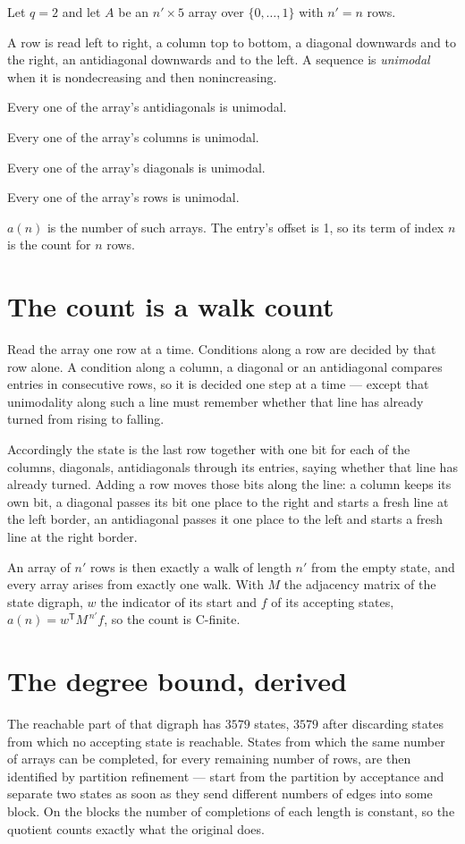 \documentclass[11pt]{article}
\theoremstyle{definition}
\begin{document}
Let $q = 2$ and let $A$ be an $n' \times 5$ array over $\{0,\dots,1\}$ with $n' = n$ rows.

A row is read left to right, a column top to bottom, a diagonal downwards and to the right, an antidiagonal downwards and to the left. A sequence is {\itshape unimodal} when it is nondecreasing and then nonincreasing.

Every one of the array's antidiagonals is unimodal.

Every one of the array's columns is unimodal.

Every one of the array's diagonals is unimodal.

Every one of the array's rows is unimodal.

$a(n)$ is the number of such arrays. The entry's offset is 1, so its term of index $n$ is the count for $n$ rows.

\section{The count is a walk count}

Read the array one row at a time. Conditions along a row are decided by that row alone. A condition along a column, a diagonal or an antidiagonal compares entries in consecutive rows, so it is decided one step at a time --- except that unimodality along such a line must remember whether that line has already turned from rising to falling.

Accordingly the state is the last row together with one bit for each of the columns, diagonals, antidiagonals through its entries, saying whether that line has already turned. Adding a row moves those bits along the line: a column keeps its own bit, a diagonal passes its bit one place to the right and starts a fresh line at the left border, an antidiagonal passes it one place to the left and starts a fresh line at the right border.

An array of $n'$ rows is then exactly a walk of length $n'$ from the empty state, and every array arises from exactly one walk. With $M$ the adjacency matrix of the state digraph, $w$ the indicator of its start and $f$ of its accepting states, $a(n) = w^{\mathsf T}M^{\,n'}f$, so the count is C-finite.

\section{The degree bound, derived}

The reachable part of that digraph has $3579$ states, $3579$ after discarding states from which no accepting state is reachable. States from which the same number of arrays can be completed, for every remaining number of rows, are then identified by partition refinement --- start from the partition by acceptance and separate two states as soon as they send different numbers of edges into some block. On the blocks the number of completions of each length is constant, so the quotient counts exactly what the original does.
\end{document}
